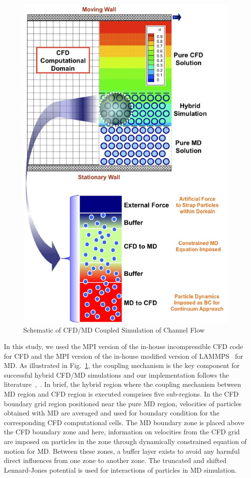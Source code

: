 \documentclass[conference,final]{IEEEtran}
\begin{document}
\begin{figure}
\centering
\includegraphics[scale=0.45]{fig1.eps}
\caption{\small Schematic of CFD/MD Coupled Simulation of Channel Flow}
\label{Fig:Couette}
\end{figure}

In this study, we used the MPI version of the in-house incompressible
CFD code~\cite{Lee} for CFD and the MPI version of the in-house
modified version of LAMMPS~\cite{LAMMPS} for MD. As illustrated in
Fig.~\ref{Fig:Couette}, the coupling mechanism is the key component
for successful hybrid CFD/MD simulations and our implementation
follows the literature~\cite{Nie},~\cite{Yen}. In brief, the hybrid
region where the coupling mechanism between MD region and CFD region
is executed comprises five sub-regions. In the CFD boundary grid
region positioned near the pure MD region, velocities of particles
obtained with MD are averaged and used for boundary condition for the
corresponding CFD computational cells. The MD boundary zone is placed
above the CFD boundary zone and here, information on velocities from
the CFD grid are imposed on particles in the zone through dynamically
constrained equation of motion for MD. Between these zones, a buffer
layer exists to avoid any harmful direct influences from one zone to
another zone. The truncated and shifted Lennard-Jones potential is
used for interactions of particles in MD simulation.
\end{document}
